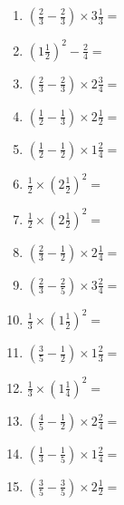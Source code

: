 \documentclass[12pt]{article}
\begin{document}
\begin{enumerate}
\item \large $ \left( \frac{2}{3} - \frac{2}{3} \right) \times 3 \frac{1}{3} = $ \vspace{1.6cm}
\item \large $ \left( 1 \frac{1}{2} \right)^2 - \frac{2}{4} = $ \vspace{1.6cm}
\item \large $ \left( \frac{2}{3} - \frac{2}{3} \right) \times 2 \frac{3}{4} = $ \vspace{1.6cm}
\item \large $ \left( \frac{1}{2} - \frac{1}{3} \right) \times 2 \frac{1}{2} = $ \vspace{1.6cm}
\item \large $ \left( \frac{1}{2} - \frac{1}{2} \right) \times 1 \frac{2}{4} = $ \vspace{1.6cm}
\item \large $ \frac{1}{2} \times \left( 2 \frac{1}{2} \right)^2 = $ \vspace{1.6cm}
\item \large $ \frac{1}{2} \times \left( 2 \frac{1}{2} \right)^2 = $ \vspace{1.6cm}
\item \large $ \left( \frac{2}{3} - \frac{1}{2} \right) \times 2 \frac{1}{4} = $ \vspace{1.6cm}
\item \large $ \left( \frac{2}{3} - \frac{2}{5} \right) \times 3 \frac{2}{4} = $ \vspace{1.6cm}
\item \large $ \frac{1}{3} \times \left( 1 \frac{1}{2} \right)^2 = $ \vspace{1.6cm}
\newpage
\item \large $ \left( \frac{3}{5} - \frac{1}{2} \right) \times 1 \frac{2}{3} = $ \vspace{1.6cm}
\item \large $ \frac{1}{3} \times \left( 1 \frac{1}{4} \right)^2 = $ \vspace{1.6cm}
\item \large $ \left( \frac{4}{5} - \frac{1}{2} \right) \times 2 \frac{2}{4} = $ \vspace{1.6cm}
\item \large $ \left( \frac{1}{3} - \frac{1}{5} \right) \times 1 \frac{2}{4} = $ \vspace{1.6cm}
\item \large $ \left( \frac{3}{5} - \frac{3}{5} \right) \times 2 \frac{1}{2} = $ \vspace{1.6cm}

\end{enumerate}
\end{document}
